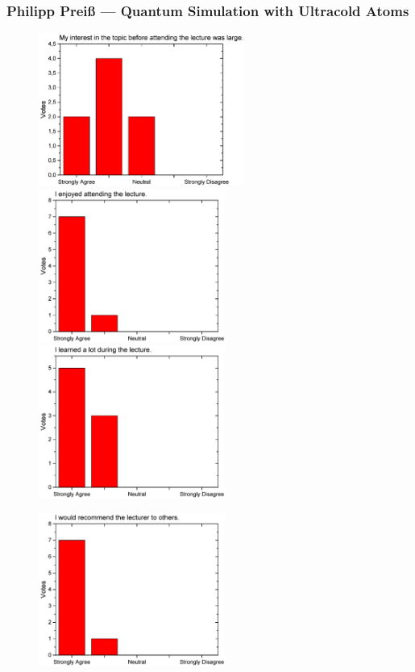 \subsubsection{Philipp Prei{\ss}  --- Quantum Simulation with Ultracold Atoms }
\begin{figure}[h!]
  \centering
  \begin{minipage}{.48\linewidth}
    \centering
      {\includegraphics[height=50mm]{figures/n/Graph21.pdf}}
      {\includegraphics[height=50mm]{figures/n/Graph22.pdf}}
      {\includegraphics[height=50mm]{figures/n/Graph23.pdf}}
  \end{minipage}\quad
  \begin{minipage}{.48\linewidth}
    \centering
      {\includegraphics[height=50mm]{figures/n/Graph24.pdf}}

\end{minipage}
\end{figure}
